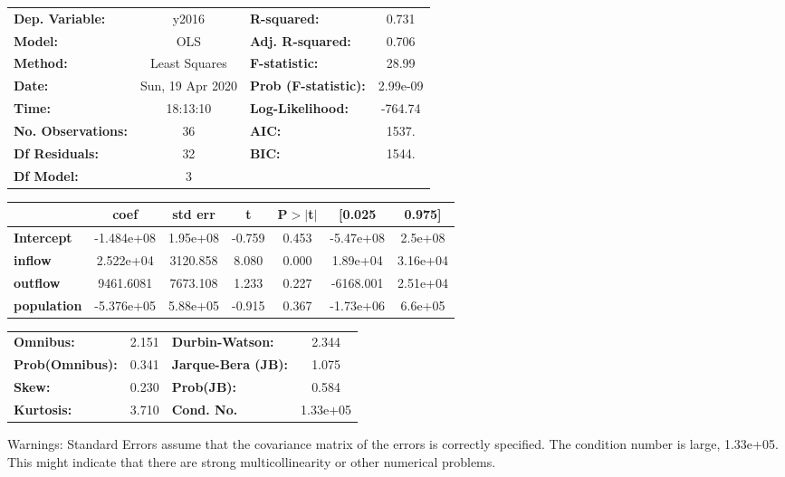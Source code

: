 \begin{center}
\begin{tabular}{lclc}
\toprule
\textbf{Dep. Variable:}    &      y2016       & \textbf{  R-squared:         } &     0.731   \\
\textbf{Model:}            &       OLS        & \textbf{  Adj. R-squared:    } &     0.706   \\
\textbf{Method:}           &  Least Squares   & \textbf{  F-statistic:       } &     28.99   \\
\textbf{Date:}             & Sun, 19 Apr 2020 & \textbf{  Prob (F-statistic):} &  2.99e-09   \\
\textbf{Time:}             &     18:13:10     & \textbf{  Log-Likelihood:    } &   -764.74   \\
\textbf{No. Observations:} &          36      & \textbf{  AIC:               } &     1537.   \\
\textbf{Df Residuals:}     &          32      & \textbf{  BIC:               } &     1544.   \\
\textbf{Df Model:}         &           3      & \textbf{                     } &             \\
\bottomrule
\end{tabular}
\begin{tabular}{lcccccc}
                    & \textbf{coef} & \textbf{std err} & \textbf{t} & \textbf{P$> |$t$|$} & \textbf{[0.025} & \textbf{0.975]}  \\
\midrule
\textbf{Intercept}  &   -1.484e+08  &     1.95e+08     &    -0.759  &         0.453        &    -5.47e+08    &      2.5e+08     \\
\textbf{inflow}     &    2.522e+04  &     3120.858     &     8.080  &         0.000        &     1.89e+04    &     3.16e+04     \\
\textbf{outflow}    &    9461.6081  &     7673.108     &     1.233  &         0.227        &    -6168.001    &     2.51e+04     \\
\textbf{population} &   -5.376e+05  &     5.88e+05     &    -0.915  &         0.367        &    -1.73e+06    &      6.6e+05     \\
\bottomrule
\end{tabular}
\begin{tabular}{lclc}
\textbf{Omnibus:}       &  2.151 & \textbf{  Durbin-Watson:     } &    2.344  \\
\textbf{Prob(Omnibus):} &  0.341 & \textbf{  Jarque-Bera (JB):  } &    1.075  \\
\textbf{Skew:}          &  0.230 & \textbf{  Prob(JB):          } &    0.584  \\
\textbf{Kurtosis:}      &  3.710 & \textbf{  Cond. No.          } & 1.33e+05  \\
\bottomrule
\end{tabular}
\end{center}

Warnings: \newline
 [1] Standard Errors assume that the covariance matrix of the errors is correctly specified. \newline
 [2] The condition number is large, 1.33e+05. This might indicate that there are \newline
 strong multicollinearity or other numerical problems.